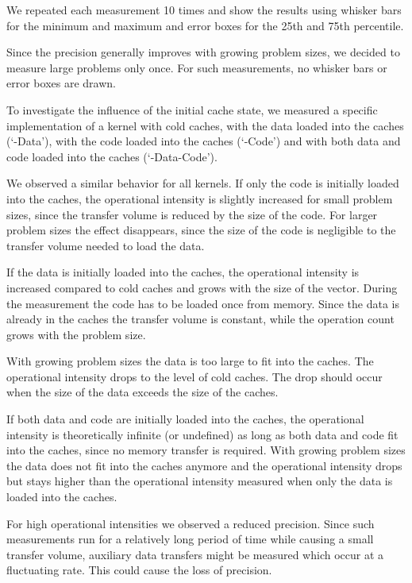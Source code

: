\documentclass[a4paper,12pt]{report}
\begin{document}
We repeated each measurement 10 times and show the results using whisker bars
for the minimum and maximum and error boxes for the 25th and 75th percentile. 

Since the precision generally improves with growing problem sizes, we decided to
measure large problems only once. For such measurements, no whisker bars or
error boxes are drawn.

To investigate the influence of the initial cache state, we measured a specific
implementation of a kernel with cold caches, with the data loaded into the
caches (`-Data'), with the code loaded into the caches (`-Code') and with
both data and code loaded into the caches (`-Data-Code').

We observed a similar behavior for all kernels. If only the code is initially
loaded into the caches, the operational intensity is slightly increased for
small problem sizes, since the transfer volume is reduced by the size of the
code. For larger problem sizes the effect disappears, since the size of
the code is negligible to the transfer volume needed to load the data.

If the data is initially loaded into the caches, the operational intensity is
increased compared to cold caches and grows with the size of the vector.
During the measurement the code has to be loaded once from memory.
Since the data is already in the caches the transfer volume is constant, while
the operation count grows with the problem size.

With growing problem sizes the data is too large to fit into the caches.
The operational intensity drops to the level of cold caches. The drop should
occur when the size of the data exceeds the size of the caches.

If both data and code are initially loaded into the caches, the operational
intensity is theoretically infinite (or undefined) as long as both data and
code fit into the caches, since no memory transfer is required. With growing
problem sizes the data does not fit into the caches anymore and the operational
intensity drops but stays higher than the operational intensity measured when
only the data is loaded into the caches.

For high operational intensities we observed a reduced precision. Since such
measurements run for a relatively long period of time while causing a small
transfer volume, auxiliary data transfers might be measured which occur at a
fluctuating rate. This could cause the loss of precision.
\end{document}
